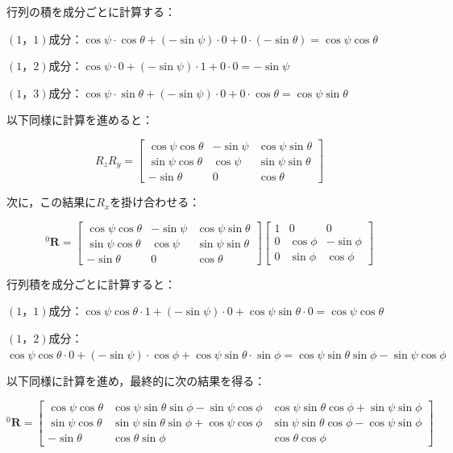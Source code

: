 行列の積を成分ごとに計算する：

$(1，1)$成分：$\cos \psi \cdot \cos \theta + (-\sin \psi) \cdot 0 + 0 \cdot (-\sin \theta) = \cos \psi \cos \theta$

$(1，2)$成分：$\cos \psi \cdot 0 + (-\sin \psi) \cdot 1 + 0 \cdot 0 = -\sin \psi$

$(1，3)$成分：$\cos \psi \cdot \sin \theta + (-\sin \psi) \cdot 0 + 0 \cdot \cos \theta = \cos \psi \sin \theta$

以下同様に計算を進めると：

\[
  R_z R_y = \begin{bmatrix} 
    \cos \psi \cos \theta & -\sin \psi & \cos \psi \sin \theta \\ 
    \sin \psi \cos \theta & \cos \psi  & \sin \psi \sin \theta \\ 
    -\sin \theta          & 0          & \cos \theta 
  \end{bmatrix}
\]

次に，この結果に$R_x$を掛け合わせる：

\[
  ^0\mathbf{R} = \begin{bmatrix} 
    \cos \psi \cos \theta & -\sin \psi & \cos \psi \sin \theta \\ 
    \sin \psi \cos \theta & \cos \psi  & \sin \psi \sin \theta \\ 
    -\sin \theta          & 0          & \cos \theta 
  \end{bmatrix}
  \begin{bmatrix} 
    1 & 0         & 0          \\ 
    0 & \cos \phi & -\sin \phi \\ 
    0 & \sin \phi & \cos \phi 
  \end{bmatrix}
\]

行列積を成分ごとに計算すると：

$(1，1)$成分：$\cos \psi \cos \theta \cdot 1 + (-\sin \psi) \cdot 0 + \cos \psi \sin \theta \cdot 0 = \cos \psi \cos \theta$

$(1，2)$成分：$\cos \psi \cos \theta \cdot 0 + (-\sin \psi) \cdot \cos \phi + \cos \psi \sin \theta \cdot \sin \phi = \cos \psi \sin \theta \sin \phi - \sin \psi \cos \phi$

以下同様に計算を進め，最終的に次の結果を得る：

\[
  ^0\mathbf{R} = 
  \begin{bmatrix} 
    \cos \psi \cos \theta & \cos \psi \sin \theta \sin \phi - \sin \psi \cos \phi & \cos \psi \sin \theta \cos \phi + \sin \psi \sin \phi \\ 
    \sin \psi \cos \theta & \sin \psi \sin \theta \sin \phi + \cos \psi \cos \phi & \sin \psi \sin \theta \cos \phi - \cos \psi \sin \phi \\ 
    - \sin \theta         & \cos \theta \sin \phi                                 & \cos \theta \cos \phi 
  \end{bmatrix} \tag{2.17}
\]


